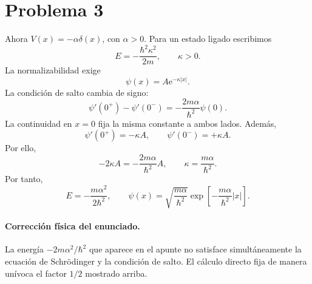 \documentclass[11pt,a4paper]{article}
\numberwithin{equation}{section}
\renewcommand{\boxed}[1]{#1}
\newcommand{\e}{\mathrm e}
\newcommand{\hb}{\hbar}
\begin{document}
\section{Problema 3}
Ahora $V(x)=-\alpha\delta(x)$, con $\alpha>0$. Para un estado ligado escribimos
\begin{equation}
E=-\frac{\hb^2\kappa^2}{2m},\qquad \kappa>0.
\end{equation}
La normalizabilidad exige
\begin{equation}
\psi(x)=A\e^{-\kappa|x|}.
\end{equation}
La condición de salto cambia de signo:
\begin{equation}
\psi'(0^+)-\psi'(0^-)=-\frac{2m\alpha}{\hb^2}\psi(0).
\end{equation}
La continuidad en $x=0$ fija la misma constante a ambos lados. Además,
\begin{equation}
\psi'(0^+)=-\kappa A,\qquad \psi'(0^-)=+\kappa A.
\end{equation}
Por ello,
\begin{equation}
-2\kappa A=-\frac{2m\alpha}{\hb^2}A,
\qquad
\kappa=\frac{m\alpha}{\hb^2}.
\end{equation}
Por tanto,
\begin{equation}
\boxed{E=-\frac{m\alpha^2}{2\hb^2},\qquad
\psi(x)=\sqrt{\frac{m\alpha}{\hb^2}}\exp\left[-\frac{m\alpha}{\hb^2}|x|\right].}
\end{equation}

\paragraph{Corrección física del enunciado.}
La energía $-2m\alpha^2/\hb^2$ que aparece en el apunte no satisface simultáneamente la ecuación de Schrödinger y la condición de salto. El cálculo directo fija de manera unívoca el factor $1/2$ mostrado arriba.
\end{document}
